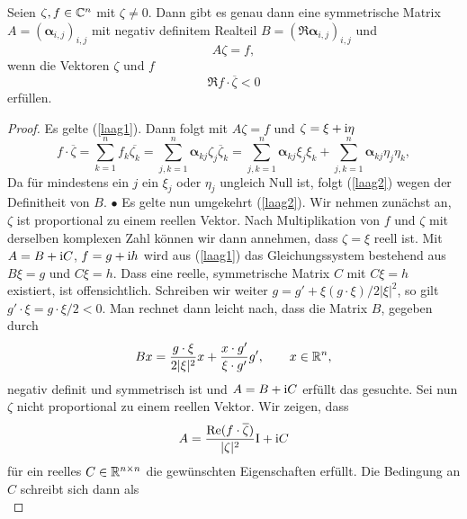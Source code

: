 \begin{lem}\label{lem3}
Seien $\zeta, f \in \mathbb C^n$ mit $\zeta \neq 0$. Dann gibt es genau dann eine symmetrische Matrix $A = (\boldsymbol\alpha_{i,j})_{i,j}$ mit negativ definitem Realteil
$B=(\Re\boldsymbol \alpha_{i,j})_{i,j}$ und
\begin{equation}\label{laag1}
   A \zeta = f,
\end{equation}
wenn die Vektoren $\zeta$ und $f$
\begin{equation} \label{laag2}
\Re f\cdot \overline \zeta < 0
\end{equation}
erfüllen.
\end{lem}
\begin{proof}
Es gelte (\ref{laag1}). Dann folgt mit $A\zeta =f$ und $\zeta=\xi+\mathrm i\eta$
\begin{equation}
 f\cdot \overline \zeta = \sum_{k=1}^{n}f_k \overline{\zeta_k} = \sum_{j,k=1}^{n} \boldsymbol\alpha_{kj} \zeta_j \overline \zeta_k
=  \sum_{j,k=1}^{n} \boldsymbol\alpha_{kj} \xi_j \xi_k +  \sum_{j,k=1}^{n} \boldsymbol\alpha_{kj} \eta_j \eta_k,
\end{equation}
Da für mindestens ein $j$ ein $\xi_j$ oder $\eta_j$ ungleich Null ist, folgt (\ref{laag2}) wegen der Definitheit von $B$. $\bullet$\qquad 
Es gelte nun umgekehrt (\ref{laag2}). Wir nehmen zunächst an, $\zeta$ ist proportional zu einem reellen Vektor. Nach Multiplikation von $f$ und $\zeta$ mit derselben komplexen Zahl können wir dann annehmen, dass $\zeta=\xi$ reell ist. Mit $A = B + \mathrm i C$, $f= g+\mathrm i h$ wird aus (\ref{laag1}) das Gleichungssystem bestehend aus $B \xi = g$ und $C \xi = h$. Dass eine reelle, symmetrische Matrix $C$ mit $C \xi = h$ existiert, ist offensichtlich. Schreiben wir weiter $g = g' + \xi (g\cdot \xi)/ 2 |\xi|^2$, so gilt $g'\cdot\xi = g\cdot\xi /2 < 0$. Man rechnet dann leicht nach, dass die Matrix $B$, gegeben durch
\begin{equation}
B x = \dfrac{g\cdot\xi }{2|\xi|^2} x + \dfrac{x\cdot g'}{\xi\cdot g'} g',\qquad x\in\mathbb R^n,
\end{equation}
negativ definit und symmetrisch ist und $A=B+\mathrm i C$ erfüllt das gesuchte. Sei nun $\zeta$ nicht proportional zu einem reellen Vektor. Wir zeigen, dass 
\begin{equation}
A = \dfrac{\operatorname{Re}( f\cdot\overline\zeta )}{|\zeta|^2} \mathrm I + \mathrm i C
\end{equation}
für ein reelles $C\in\mathbb R^{n\times n}$ die gewünschten Eigenschaften erfüllt. Die Bedingung an $C$ schreibt sich dann als
\begin{equation}

\end{equation}
\end{proof}

